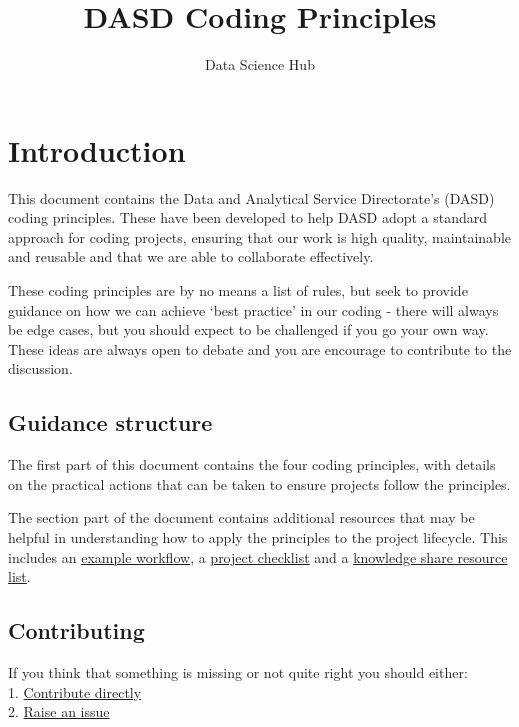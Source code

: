 \documentclass[]{book}
\title{DASD Coding Principles}
\author{Data Science Hub}
\date{}
\begin{document}
\maketitle

{
\setcounter{tocdepth}{1}
\tableofcontents
}
\hypertarget{intro}{%
\chapter*{Introduction}\label{intro}}

This document contains the Data and Analytical Service Directorate's (DASD) coding principles. These have been developed to help DASD adopt a standard approach for coding projects, ensuring that our work is high quality, maintainable and reusable and that we are able to collaborate effectively.

These coding principles are by no means a list of rules, but seek to provide guidance on how we can achieve `best practice' in our coding - there will always be edge cases, but you should expect to be challenged if you go your own way. These ideas are always open to debate and you are encourage to contribute to the discussion.

\hypertarget{structure}{%
\section*{Guidance structure}\label{structure}}

The first part of this document contains the four coding principles, with details on the practical actions that can be taken to ensure projects follow the principles.

The section part of the document contains additional resources that may be helpful in understanding how to apply the principles to the project lifecycle. This includes an \protect\hyperlink{wf}{example workflow}, a \protect\hyperlink{checklist}{project checklist} and a \protect\hyperlink{ksresources}{knowledge share resource list}.

\hypertarget{contributing}{%
\section*{Contributing}\label{contributing}}

If you think that something is missing or not quite right you should either:\\
1. \protect\hyperlink{versioncontrol}{Contribute directly}\\
2. \href{https://github.com/moj-analytical-services/our-coding-standards/issues}{Raise an issue}
\end{document}
